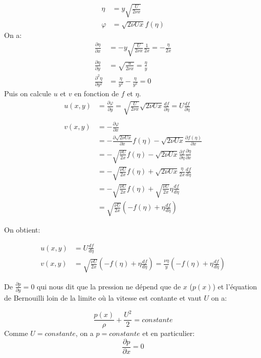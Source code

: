 \documentclass[french]{article}
\begin{document}
\begin{align*}
	\eta &= y \sqrt{\frac{U}{2\nu x }} \\
	\varphi &= \sqrt{2\nu U x} f(\eta)
\end{align*}
On a:
\begin{align}
	\frac{\partial \eta}{\partial x} &= 
	-y\sqrt{\frac{U}{2\nu x}}\frac{1}{2x} = 
	-\frac{\eta}{2x}\\
	\frac{\partial \eta}{\partial y} &= 
	\sqrt{\frac{u}{2\nu x }} = \frac{\eta}{y}\\
	\frac{\partial^{2} \eta}{\partial y^{2}} &= 
	\frac{\eta}{y^{2}} - \frac{\eta}{y^{2}} = 0
\end{align}
Puis on calcule $u$ et $v$ en fonction de $f$ et $\eta$.
\begin{align*}
	u(x,y) &= 
	\frac{\partial \varphi}{\partial y} 
	=
	\sqrt{\frac{U}{2\nu x }} \sqrt{2\nu U x}\frac{d f}{\partial \eta}
	= U \frac{d f}{\partial \eta}\\
	\\
	v(x,y) &= 
	- \frac{\partial \varphi}{\partial x} \\
	&=
	-\frac{\partial \sqrt{2\nu U x}} {\partial x}
	f(\eta) -
	\sqrt{2\nu Ux }
	\frac{\partial f(\eta)}{\partial x}\\
	&= 
	-\sqrt{\frac{\nu U}{2x}}
	f(\eta) -
	\sqrt{2\nu Ux }
	\frac{\partial f}{\partial \eta}
	\frac{\partial \eta}{\partial x}\\
	&=
	-\sqrt{\frac{\nu U}{2x}}
	f(\eta) +
	\sqrt{2\nu Ux}\frac{\eta}{2x}\frac{d f}{d \eta}
	\\
	&=
	-\sqrt{\frac{\nu U}{2x}}
	f(\eta) +
	\sqrt{\frac{\nu U}{2x}}\eta\frac{d f}{d \eta}
	\\
	&=
	\sqrt{\frac{\nu U}{2x}}
	\left(
	-f(\eta) + \eta\frac{d f}{d \eta}
	\right)
\end{align*}

On obtient:

\begin{align}
	u(x,y) &= 
	 U \frac{d f}{d \eta}\\
	v(x,y) &= 
	\sqrt{\frac{\nu U}{2x}}
	\left(
	-f(\eta) + \eta\frac{d f}{d \eta}
	\right) = 
	\frac{\nu\eta}{y}
	\left(
	-f(\eta) + \eta\frac{d f}{d \eta}
	\right)
\end{align}

De $\frac{\partial p}{\partial y} = 0$ qui nous dit que la pression ne dépend que de $x$ ($p(x)$) et l'équation de Bernouilli loin de la limite où la vitesse est contante et vaut $U$ on a:


\begin{equation*}
	\frac{p(x)}{\rho} + \frac{U^2}{2} = constante
\end{equation*}
Comme $U = constante$, on a $p = constante$ et en particulier:
\begin{equation}
	\frac{\partial p}{\partial x}  = 0
\end{equation}
\end{document}
